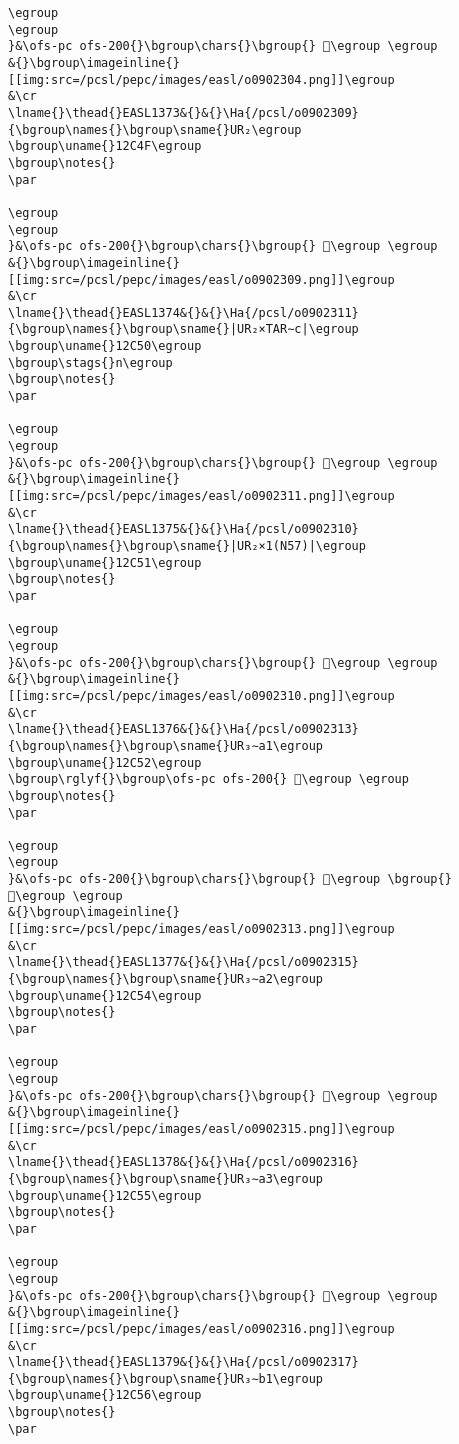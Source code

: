 \begin{verbatim}
\egroup
\egroup
}&\ofs-pc ofs-200{}\bgroup\chars{}\bgroup{} 𒱎\egroup \egroup
&{}\bgroup\imageinline{}[[img:src=/pcsl/pepc/images/easl/o0902304.png]]\egroup
&\cr
\lname{}\thead{}EASL1373&{}&{}\Ha{/pcsl/o0902309}{\bgroup\names{}\bgroup\sname{}UR₂\egroup
\bgroup\uname{}12C4F\egroup
\bgroup\notes{}
\par 

\egroup
\egroup
}&\ofs-pc ofs-200{}\bgroup\chars{}\bgroup{} 𒱏\egroup \egroup
&{}\bgroup\imageinline{}[[img:src=/pcsl/pepc/images/easl/o0902309.png]]\egroup
&\cr
\lname{}\thead{}EASL1374&{}&{}\Ha{/pcsl/o0902311}{\bgroup\names{}\bgroup\sname{}|UR₂×TAR∼c|\egroup
\bgroup\uname{}12C50\egroup
\bgroup\stags{}n\egroup
\bgroup\notes{}
\par 

\egroup
\egroup
}&\ofs-pc ofs-200{}\bgroup\chars{}\bgroup{} 𒱐\egroup \egroup
&{}\bgroup\imageinline{}[[img:src=/pcsl/pepc/images/easl/o0902311.png]]\egroup
&\cr
\lname{}\thead{}EASL1375&{}&{}\Ha{/pcsl/o0902310}{\bgroup\names{}\bgroup\sname{}|UR₂×1(N57)|\egroup
\bgroup\uname{}12C51\egroup
\bgroup\notes{}
\par 

\egroup
\egroup
}&\ofs-pc ofs-200{}\bgroup\chars{}\bgroup{} 𒱑\egroup \egroup
&{}\bgroup\imageinline{}[[img:src=/pcsl/pepc/images/easl/o0902310.png]]\egroup
&\cr
\lname{}\thead{}EASL1376&{}&{}\Ha{/pcsl/o0902313}{\bgroup\names{}\bgroup\sname{}UR₃∼a1\egroup
\bgroup\uname{}12C52\egroup
\bgroup\rglyf{}\bgroup\ofs-pc ofs-200{} 𒱒\egroup \egroup
\bgroup\notes{}
\par 

\egroup
\egroup
}&\ofs-pc ofs-200{}\bgroup\chars{}\bgroup{} 𒱒\egroup \bgroup{} 𒱓\egroup \egroup
&{}\bgroup\imageinline{}[[img:src=/pcsl/pepc/images/easl/o0902313.png]]\egroup
&\cr
\lname{}\thead{}EASL1377&{}&{}\Ha{/pcsl/o0902315}{\bgroup\names{}\bgroup\sname{}UR₃∼a2\egroup
\bgroup\uname{}12C54\egroup
\bgroup\notes{}
\par 

\egroup
\egroup
}&\ofs-pc ofs-200{}\bgroup\chars{}\bgroup{} 𒱔\egroup \egroup
&{}\bgroup\imageinline{}[[img:src=/pcsl/pepc/images/easl/o0902315.png]]\egroup
&\cr
\lname{}\thead{}EASL1378&{}&{}\Ha{/pcsl/o0902316}{\bgroup\names{}\bgroup\sname{}UR₃∼a3\egroup
\bgroup\uname{}12C55\egroup
\bgroup\notes{}
\par 

\egroup
\egroup
}&\ofs-pc ofs-200{}\bgroup\chars{}\bgroup{} 𒱕\egroup \egroup
&{}\bgroup\imageinline{}[[img:src=/pcsl/pepc/images/easl/o0902316.png]]\egroup
&\cr
\lname{}\thead{}EASL1379&{}&{}\Ha{/pcsl/o0902317}{\bgroup\names{}\bgroup\sname{}UR₃∼b1\egroup
\bgroup\uname{}12C56\egroup
\bgroup\notes{}
\par 


\end{verbatim}
